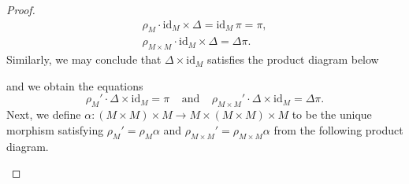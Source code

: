 \documentclass[ 12pt ]{article}
\begin{document}
\begin{enumerate}
\begin{proof}
			\begin{align*}
				\rho_M \cdot \mathrm{id}_M \times \Delta = \mathrm{id}_M\, \pi = \pi, \\
				\rho_{M \times M} \cdot \mathrm{id}_M \times \Delta = \Delta \pi.
			\end{align*}
			Similarly, we may conclude that $\Delta \times \mathrm{id}_M$ satisfies the product diagram below
			\begin{center}
			\end{center}
			and we obtain the equations $$\rho_M' \cdot \Delta \times \mathrm{id}_M = \pi\;\;\;\; \mathrm{and}\;\;\;\; \rho_{M \times M}' \cdot \Delta \times \mathrm{id}_M = \Delta \pi.$$ Next, we define $\alpha : (M \times M) \times M \to M \times (M \times M) \times M$ to be the unique morphism satisfying $\rho_M' = \rho_M \alpha$ and $\rho_{M \times M}' = \rho_{M \times M} \alpha$ from the following product diagram.
			\begin{center}
\end{center}
\end{proof}
\end{enumerate}
\end{document}
